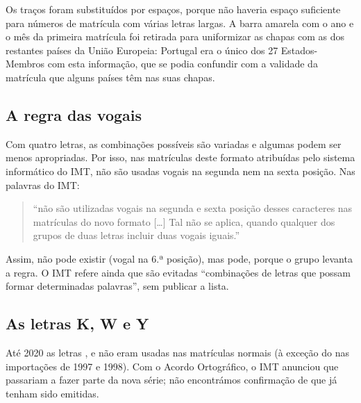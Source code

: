 
Os traços foram substituídos por espaços, porque não haveria espaço suficiente
para números de matrícula com várias letras largas. A barra amarela com o ano e
o mês da primeira matrícula foi retirada para uniformizar as chapas com as dos
restantes países da União Europeia: Portugal era o único dos 27 Estados-Membros
com esta informação, que se podia confundir com a validade da matrícula que
alguns países têm nas suas chapas.

\subsection{A regra das vogais}

Com quatro letras, as combinações possíveis são variadas e algumas podem ser
menos apropriadas. Por isso, nas matrículas deste formato atribuídas pelo
sistema informático do IMT, não são usadas vogais na segunda nem na sexta
posição. Nas palavras do IMT:

\begin{quote}\small
“não são utilizadas vogais na segunda e sexta posição desses caracteres nas
matrículas do novo formato […] Tal não se aplica, quando qualquer dos grupos de
duas letras incluir duas vogais iguais.”
\end{quote}

Assim,  não pode existir (vogal na 6.ª posição), mas
 pode, porque o grupo  levanta a regra. O IMT refere
ainda que são evitadas “combinações de letras que possam formar determinadas
palavras”, sem publicar a lista.

\subsection{As letras K, W e Y}

Até 2020 as letras ,  e  não eram usadas nas
matrículas normais (à exceção do  nas importações de 1997 e 1998). Com o
Acordo Ortográfico, o IMT anunciou que passariam a fazer parte da nova série;
não encontrámos confirmação de que já tenham sido emitidas.
